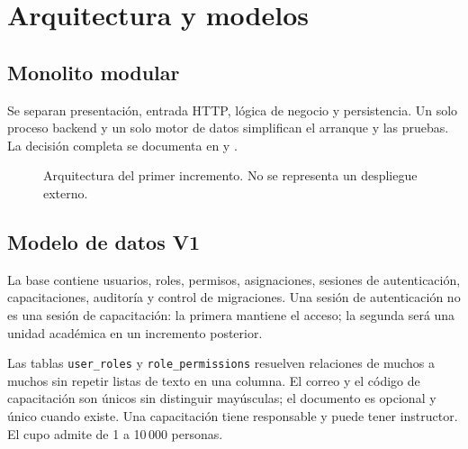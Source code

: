 \chapter{Arquitectura y modelos}
\section{Monolito modular}
Se separan presentación, entrada HTTP, lógica de negocio y persistencia. Un solo proceso backend y un solo motor de datos simplifican el arranque y las pruebas. La decisión completa se documenta en  y .

\begin{figure}[htbp]
\centering
{}
\caption{Arquitectura del primer incremento. No se representa un despliegue externo.}
\end{figure}

\section{Modelo de datos V1}
La base contiene usuarios, roles, permisos, asignaciones, sesiones de autenticación, capacitaciones, auditoría y control de migraciones. Una sesión de autenticación no es una sesión de capacitación: la primera mantiene el acceso; la segunda será una unidad académica en un incremento posterior.

Las tablas \texttt{user\_roles} y \texttt{role\_permissions} resuelven relaciones de muchos a muchos sin repetir listas de texto en una columna. El correo y el código de capacitación son únicos sin distinguir mayúsculas; el documento es opcional y único cuando existe. Una capacitación tiene responsable y puede tener instructor. El cupo admite de 1 a 10\,000 personas.

